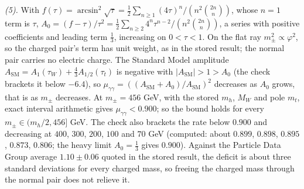 \emph{(5).} With $f(\tau) = \arcsin^{2}\sqrt{\tau} = \tfrac12\sum_{n \ge 1}(4\tau)^{n}/(n^{2}\binom{2n}{n})$, whose $n = 1$ term is $\tau$, $A_{0} = (f - \tau)/\tau^{2} = \tfrac12\sum_{n \ge 2}4^{n}\tau^{n - 2}/(n^{2}\binom{2n}{n})$, a series with positive coefficients and leading term $\tfrac13$, increasing on $0 < \tau < 1$. On the flat ray $m_{\pm}^{2} \propto \varphi^{2}$, so the charged pair's term has unit weight, as in the stored result; the normal pair carries no electric charge. The Standard Model amplitude $A_{\mathrm{SM}} = A_{1}(\tau_{W}) + \tfrac43 A_{1/2}(\tau_{t})$ is negative with $|A_{\mathrm{SM}}| > 1 > A_{0}$ (the check brackets it below $-6.4$), so $\mu_{\gamma\gamma} = ((A_{\mathrm{SM}} + A_{0})/A_{\mathrm{SM}})^{2}$ decreases as $A_{0}$ grows, that is as $m_{\pm}$ decreases. At $m_{\pm} = 456$ GeV, with the stored $m_{h}$, $M_{W}$ and pole $m_{t}$, exact interval arithmetic gives $\mu_{\gamma\gamma} < 0.900$; so the bound holds for every $m_{\pm} \in (m_{h}/2, 456]$ GeV. The check also brackets the rate below $0.900$ and decreasing at $400$, $300$, $200$, $100$ and $70$ GeV (computed: about $0.899$, $0.898$, $0.895$, $0.873$, $0.806$; the heavy limit $A_{0} = \tfrac13$ gives $0.900$). Against the Particle Data Group average $1.10 \pm 0.06$ quoted in the stored result, the deficit is about three standard deviations for every charged mass, so freeing the charged mass through the normal pair does not relieve it.
